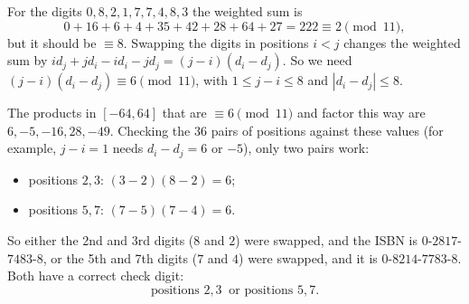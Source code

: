 For the digits $0,8,2,1,7,7,4,8,3$ the weighted sum is
\[0+16+6+4+35+42+28+64+27=222\equiv2\pmod{11},\]
but it should be $\equiv8$. Swapping the digits in positions $i<j$ changes the weighted sum by $id_j+jd_i-id_i-jd_j=(j-i)\left(d_i-d_j\right)$. So we need $(j-i)\left(d_i-d_j\right)\equiv6\pmod{11}$, with $1\le j-i\le8$ and $\left|d_i-d_j\right|\le8$.

The products in $[-64,64]$ that are $\equiv6\pmod{11}$ and factor this way are $6,-5,-16,28,-49$. Checking the $36$ pairs of positions against these values (for example, $j-i=1$ needs $d_i-d_j=6$ or $-5$), only two pairs work:
\begin{itemize}
\item positions $2,3$: $(3-2)(8-2)=6$;
\item positions $5,7$: $(7-5)(7-4)=6$.
\end{itemize}
So either the 2nd and 3rd digits ($8$ and $2$) were swapped, and the ISBN is $0$-$2817$-$7483$-$8$, or the 5th and 7th digits ($7$ and $4$) were swapped, and it is $0$-$8214$-$7783$-$8$. Both have a correct check digit:
\[\boxed{\text{positions }2,3\ \text{ or positions }5,7}.\]

